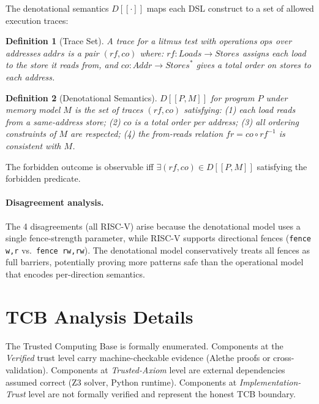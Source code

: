 \documentclass[11pt]{article}
\newtheorem{definition}{Definition}
\begin{document}
The denotational semantics $D[\![\cdot]\!]$ maps each DSL construct
to a set of allowed execution traces:

\begin{definition}[Trace Set]
A \emph{trace} for a litmus test with operations $\mathit{ops}$
over addresses $\mathit{addrs}$ is a pair $(\mathit{rf}, \mathit{co})$ where:
$\mathit{rf}: \mathit{Loads} \to \mathit{Stores}$ assigns each load
to the store it reads from, and
$\mathit{co}: \mathit{Addr} \to \mathit{Stores}^*$ gives a total
order on stores to each address.
\end{definition}

\begin{definition}[Denotational Semantics]
$D[\![P, M]\!]$ for program $P$ under memory model $M$ is the set
of traces $(\mathit{rf}, \mathit{co})$ satisfying:
(1) each load reads from a same-address store;
(2) $\mathit{co}$ is a total order per address;
(3) all ordering constraints of $M$ are respected;
(4) the from-reads relation $\mathit{fr} = \mathit{co} \circ \mathit{rf}^{-1}$
is consistent with $M$.
\end{definition}

The forbidden outcome is observable iff $\exists (\mathit{rf}, \mathit{co})
\in D[\![P, M]\!]$ satisfying the forbidden predicate.

\paragraph{Disagreement analysis.}
The 4 disagreements (all RISC-V) arise because the denotational model
uses a single fence-strength parameter, while RISC-V supports
directional fences (\texttt{fence w,r} vs.\ \texttt{fence rw,rw}).
The denotational model conservatively treats all fences as full
barriers, potentially proving more patterns safe than the operational
model that encodes per-direction semantics.

\section{TCB Analysis Details}
\label{app:tcb-details}

The Trusted Computing Base is formally enumerated.  Components at
the \emph{Verified} trust level carry machine-checkable evidence
(Alethe proofs or cross-validation).  Components at
\emph{Trusted-Axiom} level are external dependencies assumed correct
(Z3 solver, Python runtime).  Components at
\emph{Implementation-Trust} level are not formally verified and
represent the honest TCB boundary.
\end{document}
